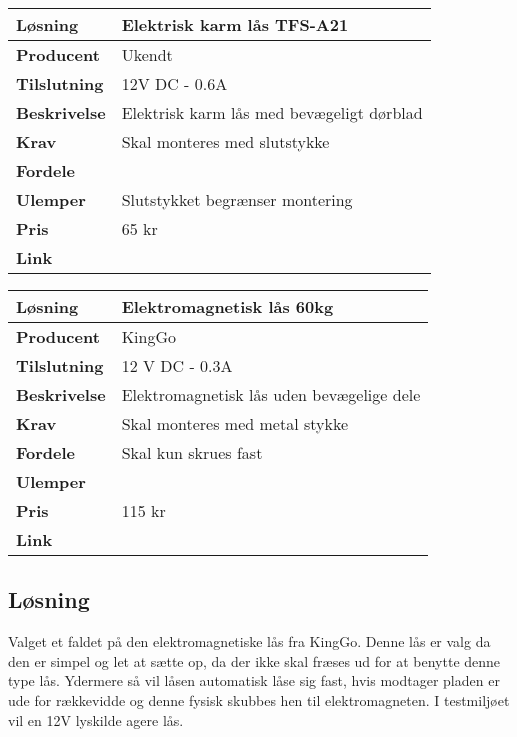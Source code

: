 \begin{table}[!htbp] \centering
	\label{tab:laas1}
\begin{tabular}{|p{6cm}|p{8cm}|}
	\hline
		\textbf{Løsning}				&Elektrisk karm lås TFS-A21 \\ \hline
		\textbf{Producent} 			&Ukendt \\ \hline
		\textbf{Tilslutning} 		&12V DC - 0.6A \\ \hline
		\textbf{Beskrivelse} 		&Elektrisk karm lås med bevægeligt dørblad \\ \hline
		\textbf{Krav} 				&Skal monteres med slutstykke \\ \hline
		\textbf{Fordele}				& \\ \hline
		\textbf{Ulemper} 			&Slutstykket begrænser montering \\ \hline
		\textbf{Pris} 				&65 kr \\ \hline
		\textbf{Link} 				& \\ \hline		
\end{tabular}
\end{table}

\begin{table}[!htbp] \centering
	\label{tab:laas2}
\begin{tabular}{|p{6cm}|p{8cm}|}
	\hline
		\textbf{Løsning}				&Elektromagnetisk lås 60kg \\ \hline
		\textbf{Producent} 			&KingGo \\ \hline
		\textbf{Tilslutning} 		&12 V DC - 0.3A\\ \hline
		\textbf{Beskrivelse} 		&Elektromagnetisk lås uden bevægelige dele \\ \hline
		\textbf{Krav} 				&Skal monteres med metal stykke \\ \hline
		\textbf{Fordele}				&Skal kun skrues fast \\ \hline
		\textbf{Ulemper} 			& \\ \hline
		\textbf{Pris} 				&115 kr \\ \hline
		\textbf{Link} 				&\\ \hline		
\end{tabular}
\end{table}

\subsection{Løsning}

Valget et faldet på den elektromagnetiske lås fra KingGo. Denne lås er valg da den er simpel og let at sætte op, da der ikke skal fræses ud for at benytte denne type lås. Ydermere så vil låsen automatisk låse sig fast, hvis modtager pladen er ude for rækkevidde og denne fysisk skubbes hen til elektromagneten. I testmiljøet vil en 12V lyskilde agere lås.
